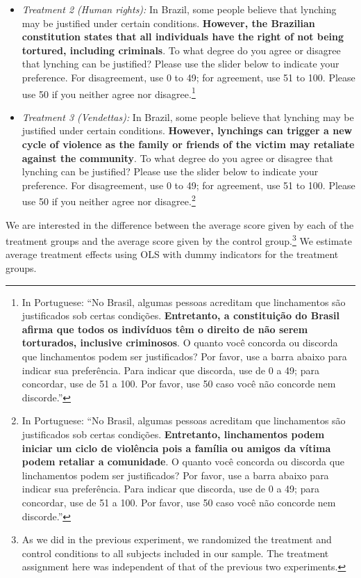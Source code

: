 \documentclass[12pt,ansiapaper]{article}
\providecommand{\tightlist}{%
   \setlength{\itemsep}{0pt}\setlength{\parskip}{0pt}}
\begin{document}
\begin{itemize}
\tightlist
\item
  \emph{Treatment 2 (Human rights):} In Brazil, some people believe that lynching may be justified under certain conditions. \textbf{However, the Brazilian constitution states that all individuals have the right of not being tortured, including criminals}. To what degree do you agree or disagree that lynching can be justified? Please use the slider below to indicate your preference. For disagreement, use 0 to 49; for agreement, use 51 to 100. Please use 50 if you neither agree nor disagree.\footnote{In Portuguese: ``No Brasil, algumas pessoas acreditam que linchamentos são justificados sob certas condições. \textbf{Entretanto, a constituição do Brasil afirma que todos os indivíduos têm o direito de não serem torturados, inclusive criminosos}. O quanto você concorda ou discorda que linchamentos podem ser justificados? Por favor, use a barra abaixo para indicar sua preferência. Para indicar que discorda, use de 0 a 49; para concordar, use de 51 a 100. Por favor, use 50 caso você não concorde nem discorde.''}
\end{itemize}

\begin{itemize}
\tightlist
\item
  \emph{Treatment 3 (Vendettas):} In Brazil, some people believe that lynching may be justified under certain conditions. \textbf{However, lynchings can trigger a new cycle of violence as the family or friends of the victim may retaliate against the community}. To what degree do you agree or disagree that lynching can be justified? Please use the slider below to indicate your preference. For disagreement, use 0 to 49; for agreement, use 51 to 100. Please use 50 if you neither agree nor disagree.\footnote{In Portuguese: ``No Brasil, algumas pessoas acreditam que linchamentos são justificados sob certas condições. \textbf{Entretanto, linchamentos podem iniciar um ciclo de violência pois a família ou amigos da vítima podem retaliar a comunidade}. O quanto você concorda ou discorda que linchamentos podem ser justificados? Por favor, use a barra abaixo para indicar sua preferência. Para indicar que discorda, use de 0 a 49; para concordar, use de 51 a 100. Por favor, use 50 caso você não concorde nem discorde.''}
\end{itemize}

We are interested in the difference between the average score given by each of the treatment groups and the average score given by the control group.\footnote{As we did in the previous experiment, we randomized the treatment and control conditions to all subjects included in our sample. The treatment assignment here was independent of that of the previous two experiments.} We estimate average treatment effects using OLS with dummy indicators for the treatment groups.
\end{document}
